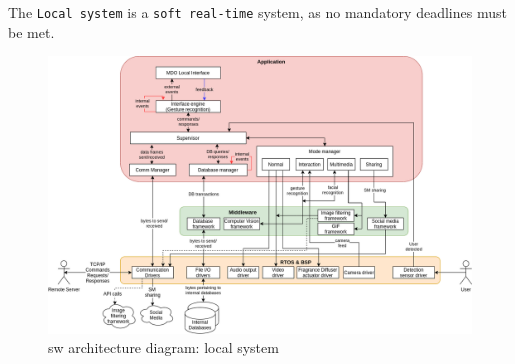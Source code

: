 The \texttt{Local system} is a \texttt{soft real-time} system, as no mandatory
deadlines must be met.
%
\begin{figure}[htb!]
\centering
    \includegraphics[width=1.0\columnwidth]{./img/sw-arch-local.png}
  \caption{\gls{sw} architecture diagram: local system}%
\label{fig:sw-arch-local}
\end{figure}
%
%
